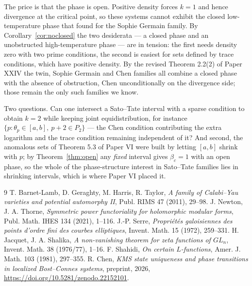 \documentclass[11pt]{amsart}
\numberwithin{equation}{section}
\theoremstyle{definition}
\theoremstyle{remark}
\begin{document}
The price is that the phase is open. Positive density forces $k=1$ and hence divergence at the
critical point, so these systems cannot exhibit the closed low-temperature phase that
\cite[Thm.~5.5]{Main} found for the Sophie Germain family. By Corollary~\ref{cor:noclosed} the
two desiderata --- a closed phase and an unobstructed high-temperature phase --- are in
tension: the first needs density zero with two prime conditions, the second is easiest for
sets defined by trace conditions, which have positive density. By the revised Theorem 2.2(2) of Paper XXIV the twin, Sophie Germain and Chen families all
combine a closed phase with the absence of obstruction, Chen unconditionally on the
divergence side; those remain the only such families we know.

Two questions. Can one intersect a Sato--Tate interval with a sparse condition to obtain
$k=2$ while keeping joint equidistribution, for instance
$\{p:\theta_p\in[a,b],\ p+2\in P_2\}$ --- the Chen condition contributing the extra logarithm
and the trace condition remaining independent of it? And second, the anomalous sets of
Theorem 5.3 of Paper VI were built by letting $[a,b]$ shrink with $p$; by
Theorem~\ref{thm:open} any \emph{fixed} interval gives $\beta_c=1$ with an open phase, so the
whole of the phase-structure interest in Sato--Tate families lies in shrinking intervals,
which is where Paper VI placed it.

\begin{thebibliography}{9}
 T. Barnet-Lamb, D. Geraghty, M. Harris, R. Taylor, \emph{A family of Calabi--Yau varieties and potential automorphy II}, Publ. RIMS 47 (2011), 29--98.
 J. Newton, J. A. Thorne, \emph{Symmetric power functoriality for holomorphic modular forms}, Publ. Math. IHES 134 (2021), 1--116.
 J.-P. Serre, \emph{Propri\'et\'es galoisiennes des points d'ordre fini des courbes elliptiques}, Invent. Math. 15 (1972), 259--331.
 H. Jacquet, J. A. Shalika, \emph{A non-vanishing theorem for zeta functions of $GL_n$}, Invent. Math. 38 (1976/77), 1--16.
 F. Shahidi, \emph{On certain $L$-functions}, Amer. J. Math. 103 (1981), 297--355.
 R. Chen, \emph{KMS state uniqueness and phase transitions in localized Bost--Connes systems}, preprint, 2026, \newline\url{https://doi.org/10.5281/zenodo.22152101}.
\end{thebibliography}
\end{document}
